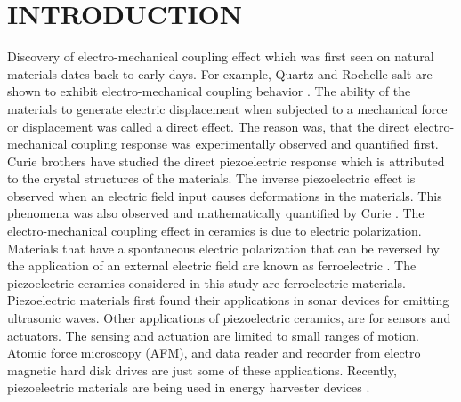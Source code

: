 %
%
%  

 

\pagestyle{plain} %
\setcounter{page}{1} 
\chapter{\uppercase {Introduction}}
Discovery of electro-mechanical coupling effect which was first seen on natural materials dates back to early days.
For example, Quartz and Rochelle salt are shown to exhibit electro-mechanical coupling behavior \cite{Lines1977}.
The ability of the materials to generate electric displacement when subjected to a mechanical force or displacement was called a direct effect.
The reason was, that the direct electro-mechanical coupling response was experimentally observed and quantified first.  
Curie brothers have studied the direct piezoelectric response \cite{Curie1882,Mould2007}
 which is attributed to the crystal structures of the materials.
The inverse piezoelectric effect is observed when an electric field input causes deformations in the materials.
This phenomena was also observed and mathematically quantified by Curie \cite{Curie1882,Mould2007}. 
The electro-mechanical coupling effect in ceramics is due to electric polarization.
Materials that have a spontaneous electric polarization that can be reversed by the application of an external electric field are known as ferroelectric \cite{Lines1977}.
The piezoelectric ceramics considered in this study are ferroelectric materials.
Piezoelectric materials first found their applications in sonar devices for emitting ultrasonic waves. 
Other applications of piezoelectric ceramics, are for sensors and actuators.
The sensing and actuation are limited to small ranges of motion.
Atomic force microscopy (AFM), and data reader and recorder from electro magnetic hard disk drives are just some of these applications. 
Recently, piezoelectric materials are being used in energy harvester devices \cite{erturk2011piezoelectric}. 


